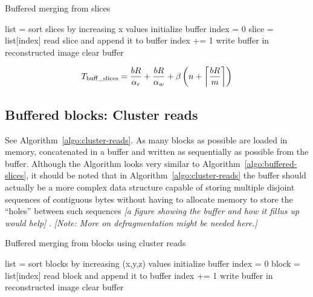 \documentclass[10pt, conference, compsocconf]{IEEEtran}
\DeclarePairedDelimiter{\ceil}{\lceil}{\rceil}
\newcommand{\todo}[1]{
  \color{red}\emph{[#1]}
  \color{black}
}
\newcommand{\note}[1]{
  \color{blue}\emph{[Note: #1]}
  \color{black}
}
\begin{document}
\begin{algorithm}[h]
  \caption{Buffered merging from slices}
  \label{algo:buffered-slices}
  \begin{algorithmic}
    \STATE list = sort slices by increasing x values
    \STATE initialize buffer
    \STATE index = 0
        \STATE slice = list[index]
        \STATE read slice and append it to buffer
        \STATE index += 1
       \ENDWHILE
       \STATE write buffer in reconstructed image
       \STATE clear buffer
    \ENDWHILE
  \end{algorithmic}
\end{algorithm}

\begin{equation}
T_\mathrm{buff\_slices} = \frac{bR}{\alpha_r}+\frac{bR}{\alpha_w}+\beta\left( n + \ceil*{\frac{bR}{m}}\right)
\end{equation}


\subsection{Buffered blocks: Cluster reads}


See Algorithm~\ref{algo:cluster-reads}. As many blocks as possible are
loaded in memory, concatenated in a buffer and written as sequentially
as possible from the buffer. Although the Algorithm looks very similar
to Algorithm~\ref{algo:buffered-slices}, it should be noted that in
Algorithm~\ref{algo:cluster-reads} the buffer should actually be a
more complex data structure capable of storing multiple disjoint
sequences of contiguous bytes without having to allocate memory to
store the ``holes'' between such sequences \todo{a figure showing the
  buffer and how it fillus up would help}.  \note{More on
  defragmentation might be needed here.}
\begin{algorithm}[h]
  \caption{Buffered merging from blocks using cluster reads}
  \label{algo:cluster-reads}
  \begin{algorithmic}
    \STATE list = sort blocks by increasing (x,y,z) values
    \STATE initialize buffer
    \STATE index = 0
        \STATE block = list[index]
        \STATE read block and append it to buffer
        \STATE index += 1
        \ENDWHILE
       \STATE write buffer in reconstructed image
       \STATE clear buffer
    \ENDWHILE
  \end{algorithmic}
\end{algorithm}
\end{document}
